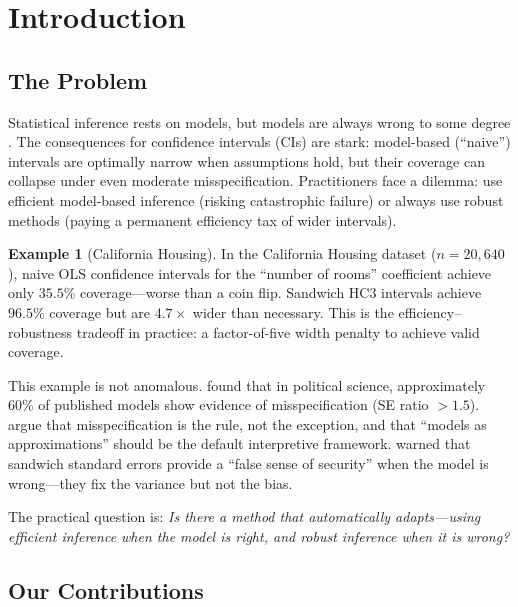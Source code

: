 \documentclass[12pt]{article}
\theoremstyle{definition}
\newtheorem{example}{Example}
\theoremstyle{remark}
\begin{document}
\newpage
\tableofcontents
\newpage

\section{Introduction}\label{sec:intro}

\subsection{The Problem}

Statistical inference rests on models, but models are always wrong to some degree \citep{box1976science}. The consequences for confidence intervals (CIs) are stark: model-based (``naive'') intervals are optimally narrow when assumptions hold, but their coverage can collapse under even moderate misspecification. Practitioners face a dilemma: use efficient model-based inference (risking catastrophic failure) or always use robust methods (paying a permanent efficiency tax of wider intervals).

\begin{example}[California Housing]
In the California Housing dataset ($n = 20{,}640$), naive OLS confidence intervals for the ``number of rooms'' coefficient achieve only $35.5\%$ coverage---worse than a coin flip. Sandwich HC3 intervals achieve $96.5\%$ coverage but are $4.7\times$ wider than necessary. This is the efficiency--robustness tradeoff in practice: a factor-of-five width penalty to achieve valid coverage.
\end{example}

This example is not anomalous. \citet{king2015robust} found that in political science, approximately 60\% of published models show evidence of misspecification (SE ratio $> 1.5$). \citet{buja2019models} argue that misspecification is the rule, not the exception, and that ``models as approximations'' should be the default interpretive framework. \citet{freedman2006so} warned that sandwich standard errors provide a ``false sense of security'' when the model is wrong---they fix the variance but not the bias.

The practical question is: \emph{Is there a method that automatically adapts---using efficient inference when the model is right, and robust inference when it is wrong?}

\subsection{Our Contributions}
\end{document}
